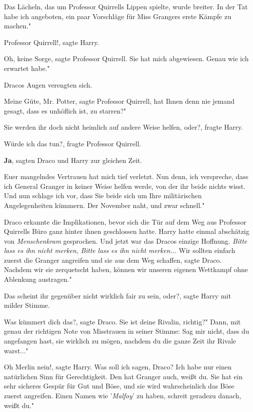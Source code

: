 Das Lächeln, das um Professor Quirrells Lippen spielte, wurde breiter. \glqq{}In
der Tat habe ich angeboten, ein paar Vorschläge für Miss Grangers erste Kämpfe
zu machen."

\glqq{}Professor Quirrell!\grqq{}, sagte Harry.

\glqq{}Oh, keine Sorge\grqq{}, sagte Professor Quirrell. \glqq{}Sie hat mich
abgewiesen. Genau wie ich erwartet habe."

Dracos Augen verengten sich.

\glqq{}Meine Güte, Mr. Potter\grqq{}, sagte Professor Quirrell, \glqq{}hat Ihnen
denn nie jemand gesagt, dass es unhöflich ist, zu starren?"

\glqq{}Sie werden ihr doch nicht heimlich auf andere Weise helfen, oder?\grqq{},
fragte Harry.

\glqq{}Würde ich das tun?\grqq{}, fragte Professor Quirrell.

\glqq{}\textbf{Ja}\grqq{}, sagten Draco und Harry zur gleichen Zeit.

\glqq{}Euer mangelndes Vertrauen hat mich tief verletzt. Nun denn, ich
verspreche, dass ich General Granger in keiner Weise helfen werde, von der ihr
beide nichts wisst. Und nun schlage ich vor, dass Sie beide sich um Ihre
militärischen Angelegenheiten kümmern. Der November naht, und zwar schnell."

Draco erkannte die Implikationen, bevor sich die Tür auf dem Weg aus Professor
Quirrells Büro ganz hinter ihnen geschlossen hatte. Harry hatte einmal
abschätzig von \glqq{}\emph{Menschenkram}\grqq{} gesprochen. Und jetzt war das
Dracos einzige Hoffnung.
\emph{Bitte lass es ihn nicht merken,}
\emph{Bitte lass es ihn nicht merken...}
\glqq{}Wir sollten einfach zuerst die Granger angreifen und sie aus dem Weg
schaffen\grqq{}, sagte Draco. \glqq{}Nachdem wir sie zerquetscht haben, können
wir unseren eigenen Wettkampf ohne Ablenkung austragen."

\glqq{}Das scheint ihr gegenüber nicht wirklich fair zu sein, oder?\grqq{}, sagte
Harry mit milder Stimme.

\glqq{}Was kümmert dich das?\grqq{}, sagte Draco. \glqq{}Sie ist deine Rivalin,
richtig?" Dann, mit genau der richtigen Note von Misstrauen in seiner Stimme:
\glqq{}Sag mir nicht, dass du angefangen hast, sie wirklich zu mögen, nachdem du
die ganze Zeit ihr Rivale warst..."

\glqq{}Oh Merlin nein!\grqq{}, sagte Harry. \glqq{}Was soll ich sagen, Draco? Ich
habe nur einen natürlichen Sinn für Gerechtigkeit. Den hat Granger auch, weißt
du. Sie hat ein sehr sicheres Gespür für Gut und Böse, und sie wird
wahrscheinlich das Böse zuerst angreifen. Einen Namen wie '\emph{Malfoy}' zu
haben, schreit geradezu danach, weißt du."

